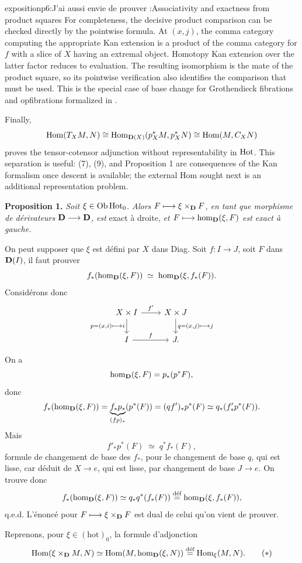 \begin{dcomment}{exposition}{p6:J’ai aussi envie de prouver :}{Associativity and exactness from product squares}
For completeness, the decisive product comparison can be checked directly by the pointwise formula. At \((x,j)\), the comma category computing the appropriate Kan extension is a product of the comma category for \(f\) with a slice of \(X\) having an extremal object. Homotopy Kan extension over the latter factor reduces to evaluation. The resulting isomorphism is the mate of the product square, so its pointwise verification also identifies the comparison that must be used. This is the special case of base change for Grothendieck fibrations and opfibrations formalized in \citet[Proposition 1.24]{Groth2013}.

Finally,
\[
 \Hom(T_XM,N)
 \cong\Hom_{\D(X)}(p_X^*M,p_X^*N)
 \cong\Hom(M,C_XN)
\]
proves the tensor-cotensor adjunction without representability in \(\Hot\). This separation is useful: (7), (9), and Proposition 1 are consequences of the Kan formalism once descent is available; the external Hom sought next is an additional representation problem.
\end{dcomment}


\textbf{Proposition 1.} \textit{Soit $\xi\in\Ob\Hot_0$. Alors $F\longmapsto\xi\times_{\D}F$, en tant que morphisme de dérivateurs $\D\longrightarrow\D$, est} exact à droite, \textit{et $F\longmapsto\hm_{\D}(\xi,F)$ est exact à gauche.}

On peut supposer que $\xi$ est défini par $X$ dans Diag. Soit $f:I\longrightarrow J$, soit $F$ dans $\D(I)$, il faut prouver
\[
f_*(\hm_{\D}(\xi,F))\;\simeq\;\hm_{\D}(\xi,f_*(F)).
\]
Considérons donc
\[
\begin{tikzcd}
X\times I \ar[r,"f'"] \ar[d,"{p=(x,i)\longmapsto i}"'] & X\times J \ar[d,"{q=(x,j)\longmapsto j}"] \\
I \ar[r,"f"] & J.
\end{tikzcd}
\]

On a
\[
\hm_{\D}(\xi,F)=p_*(p^*F),
\]
donc
\[
f_*(\hm_{\D}(\xi,F))=\underbrace{f_*p_*}_{(fp)_*}(p^*(F))=(qf')_*p^*(F)\simeq q_*(f'_*p^*(F)).
\]
Mais
\[
f'_*p^*(F)\;\simeq\;q^*f_*(F),
\]
formule de changement de base des $f_*$, pour le changement de base $q$, qui est lisse, car déduit de $X\longrightarrow e$, qui est lisse, par changement de base $J\longrightarrow e$. On trouve
donc
\[
f_*(\hm_{\D}(\xi,F))\simeq q_*q^*(f_*(F))\defeq\hm_{\D}(\xi,f_*(F)),
\]
q.e.d. L’énoncé pour $F\longmapsto\xi\times_{\D}F$ est dual de celui qu’on vient de prouver.

Reprenons, pour $\xi\in(\mathrm{hot})_0$, la formule d’adjonction
\[
\Hom(\xi\times_{\D}M,N)\simeq\Hom(M,\hm_{\D}(\xi,N))\defeq\Hom_{\xi}(M,N).
\tag*{$(*)$}
\]

